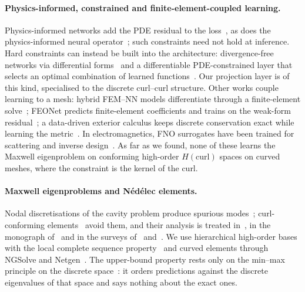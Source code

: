 \paragraph{Physics-informed, constrained and finite-element-coupled learning.}
Physics-informed networks add the PDE residual to the loss~\citep{raissi2019physics}, as does the physics-informed neural operator~\citep{li2024physics}; such constraints need not hold at inference.
Hard constraints can instead be built into the architecture: divergence-free networks via differential forms~\citep{richterpowell2022neural} and a differentiable PDE-constrained layer that selects an optimal combination of learned functions~\citep{negiar2023learning}.
Our projection layer is of this kind, specialised to the discrete curl--curl structure.
Other works couple learning to a mesh: hybrid FEM--NN models differentiate through a finite-element solve~\citep{mitusch2021hybrid}; FEONet predicts finite-element coefficients and trains on the weak-form residual~\citep{lee2025finite}; a data-driven exterior calculus keeps discrete conservation exact while learning the metric~\citep{trask2022enforcing}.
In electromagnetics, FNO surrogates have been trained for scattering and inverse design~\citep{augenstein2023neural}.
As far as we found, none of these learns the Maxwell eigenproblem on conforming high-order $H(\mathrm{curl})$ spaces on curved meshes, where the constraint is the kernel of the curl.

\paragraph{Maxwell eigenproblems and Nédélec elements.}
Nodal discretisations of the cavity problem produce spurious modes~\citep{bossavit1990solving}; curl-conforming elements~\citep{nedelec1980mixed} avoid them, and their analysis is treated in~\citep{boffi2000fortin,caorsi2001spurious}, in the monograph of~\citet{monk2003finite} and in the surveys of~\citet{hiptmair2002finite} and~\citet{boffi2010finite}.
We use hierarchical high-order bases with the local complete sequence property~\citep{schoberl2005high} and curved elements through NGSolve and Netgen~\citep{schoberl2014cpp11,schoberl1997netgen}.
The upper-bound property rests only on the min--max principle on the discrete space~\citep{babuska1991eigenvalue}: it orders predictions against the discrete eigenvalues of that space and says nothing about the exact ones.

